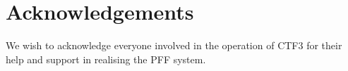 \documentclass[%
 reprint,
superscriptaddress,
 amsmath,amssymb,
 prl,
]{revtex4-1}
\begin{document}


\section{\label{s:ack}Acknowledgements}
\begin{acknowledgments}
	We wish to acknowledge everyone involved in the operation of CTF3 for their 
	help and support in realising the PFF system.
\end{acknowledgments}

\end{document}
